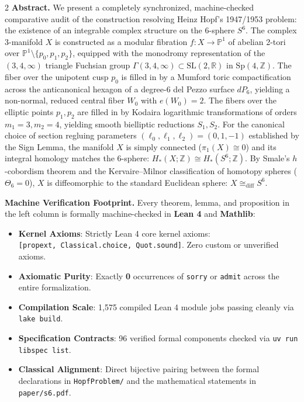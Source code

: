 \documentclass[10pt]{article}
\newcommand{\dbZ}{\mathbb{Z}}
\newcommand{\dbR}{\mathbb{R}}
\newcommand{\dbP}{\mathbb{P}}
\begin{document}
\begin{multicols}{2}
\noindent\textbf{Abstract.}
We present a completely synchronized, machine-checked comparative audit of the construction resolving Heinz Hopf's 1947/1953 problem: the existence of an integrable complex structure on the 6-sphere $S^6$.
The complex 3-manifold $X$ is constructed as a modular fibration $f\colon X \to \dbP^1$ of abelian 2-tori over $\dbP^1 \setminus \{p_0, p_1, p_2\}$, equipped with the monodromy representation of the $(3,4,\infty)$ triangle Fuchsian group $\Gamma(3,4,\infty) \subset \mathrm{SL}(2, \dbR)$ in $\mathrm{Sp}(4, \dbZ)$.
The fiber over the unipotent cusp $p_0$ is filled in by a Mumford toric compactification across the anticanonical hexagon of a degree-6 del Pezzo surface $dP_6$, yielding a non-normal, reduced central fiber $W_0$ with $e(W_0) = 2$.
The fibers over the elliptic points $p_1, p_2$ are filled in by Kodaira logarithmic transformations of orders $m_1 = 3, m_2 = 4$, yielding smooth bielliptic reductions $S_1, S_2$.
For the canonical choice of section regluing parameters $(\ell_0, \ell_1, \ell_2) = (0, 1, -1)$ established by the Sign Lemma, the manifold $X$ is simply connected ($\pi_1(X) \cong 0$) and its integral homology matches the 6-sphere: $H_*(X; \dbZ) \cong H_*(S^6; \dbZ)$.
By Smale's $h$-cobordism theorem and the Kervaire--Milnor classification of homotopy spheres ($\Theta_6 = 0$), $X$ is diffeomorphic to the standard Euclidean sphere: $X \cong_{\mathrm{diff}} S^6$.

\columnbreak

\noindent\textbf{Machine Verification Footprint.}
Every theorem, lemma, and proposition in the left column is formally machine-checked in \textbf{Lean 4} and \textbf{Mathlib}:
\begin{itemize}[itemsep=1pt, topsep=1pt, parsep=0pt]
    \item \textbf{Kernel Axioms}: Strictly Lean 4 core kernel axioms:\\
    \texttt{[propext, Classical.choice, Quot.sound]}. Zero custom or unverified axioms.
    \item \textbf{Axiomatic Purity}: Exactly \textbf{0} occurrences of \texttt{sorry} or \texttt{admit} across the entire formalization.
    \item \textbf{Compilation Scale}: 1,575 compiled Lean 4 module jobs passing cleanly via \texttt{lake build}.
    \item \textbf{Specification Contracts}: 96 verified formal components checked via \texttt{uv run libspec list}.
    \item \textbf{Classical Alignment}: Direct bijective pairing between the formal declarations in \texttt{HopfProblem/} and the mathematical statements in \texttt{paper/s6.pdf}.
\end{itemize}
\end{multicols}
\end{document}
